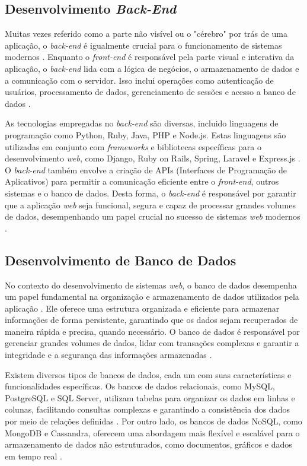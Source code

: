 \subsection{Desenvolvimento \textit{Back-End}}
    
Muitas vezes referido como a parte não visível ou o "cérebro" por trás de uma aplicação, o \textit{back-end} é igualmente crucial para o funcionamento de sistemas modernos \cite{backend}. Enquanto o \textit{front-end} é responsável pela parte visual e interativa da aplicação, o \textit{back-end} lida com a lógica de negócios, o armazenamento de dados e a comunicação com o servidor. Isso inclui operações como autenticação de usuários, processamento de dados, gerenciamento de sessões e acesso a banco de dados \cite{backenddevroles}.
    
As tecnologias empregadas no \textit{back-end} são diversas, incluido linguagens de programação como Python, Ruby, Java, PHP e Node.js. Estas linguagens são utilizadas em conjunto com \textit{frameworks} e bibliotecas específicas para o desenvolvimento \textit{web}, como Django, Ruby on Rails, Spring, Laravel e Express.js \cite{eloquentjavascript}. O \textit{back-end} também envolve a criação de APIs (Interfaces de Programação de Aplicativos) para permitir a comunicação eficiente entre o \textit{front-end}, outros sistemas e o banco de dados. Desta forma, o \textit{back-end} é responsável por garantir que a aplicação \textit{web} seja funcional, segura e capaz de processar grandes volumes de dados, desempenhando um papel crucial no sucesso de sistemas \textit{web} modernos \cite{javascriptframework}.
    
\subsection{Desenvolvimento de Banco de Dados}
    
No contexto do desenvolvimento de sistemas \textit{web}, o banco de dados desempenha um papel fundamental na organização e armazenamento de dados utilizados pela aplicação \cite{databasedepth}. Ele oferece uma estrutura organizada e eficiente para armazenar informações de forma persistente, garantindo que os dados sejam recuperados de maneira rápida e precisa, quando necessário. O banco de dados é responsável por gerenciar grandes volumes de dados, lidar com transações complexas e garantir a integridade e a segurança das informações armazenadas \cite{databasesql}.
    
Existem diversos tipos de bancos de dados, cada um com suas características e funcionalidades específicas. Os bancos de dados relacionais, como MySQL, PostgreSQL e SQL Server, utilizam tabelas para organizar os dados em linhas e colunas, facilitando consultas complexas e garantindo a consistência dos dados por meio de relações definidas \cite{databasesqlnet}. Por outro lado, os bancos de dados NoSQL, como MongoDB e Cassandra, oferecem uma abordagem mais flexível e escalável para o armazenamento de dados não estruturados, como documentos, gráficos e dados em tempo real \cite{databasedepth}.
    
